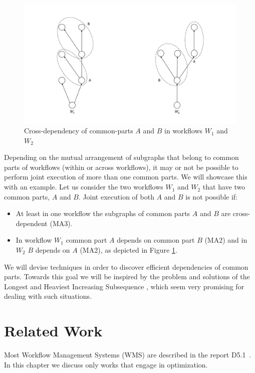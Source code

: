 \documentclass[12pt,openany,onecolumn]{book}
\begin{document}
\begin{figure}[h]
\centering
\includegraphics[width=\linewidth]{figs/cross-dep_of_2_w}
\caption{Cross-dependency of common-parts $A$ and $B$ in workflows $W_1$ and $W_2$}\label{fig:cross-dep_of_2_w}
\end{figure}


Depending on the mutual arrangement of subgraphs that belong to common parts of workflows (within or across workflows), it may or not be possible to perform joint execution of more than one common parts. We will showcase this with an example. Let us consider the two workflows $W_1$ and $W_2$ that have two common parts, $A$ and $B$. Joint execution of both $A$ and $B$ is not possible if:
\begin{itemize}
\item At least in one workflow the subgraphs of common parts $A$ and $B$ are cross-dependent (MA3).
\item In workflow $W_1$ common part $A$ depends on common part $B$ (MA2) and in $W_2$ $B$ depends on $A$ (MA2), as depicted in Figure \ref{fig:cross-dep_of_2_w}.
\end{itemize}

We will devise techniques in order to discover efficient dependencies of common parts. Towards this goal we will be inspired by the problem and solutions of the Longest and Heaviest Increasing Subsequence \cite{Jacobson:1992:HIS:647812.738135,Yang:2005:FAC:1710865.1711092}, which seem very promising for dealing with such situations.



\chapter{Related Work}\label{chapt:related}
Most Workflow Management Systems (WMS) are described in the report D5.1~\cite{d5.1}. In this chapter we discuss only works that engage in optimization.
\end{document}
